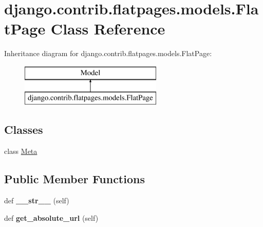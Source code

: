 \hypertarget{classdjango_1_1contrib_1_1flatpages_1_1models_1_1_flat_page}{}\section{django.\+contrib.\+flatpages.\+models.\+Flat\+Page Class Reference}
\label{classdjango_1_1contrib_1_1flatpages_1_1models_1_1_flat_page}
Inheritance diagram for django.\+contrib.\+flatpages.\+models.\+Flat\+Page\+:\begin{figure}[H]
\begin{center}
\leavevmode
\includegraphics[height=2.000000cm]{classdjango_1_1contrib_1_1flatpages_1_1models_1_1_flat_page}
\end{center}
\end{figure}
\subsection*{Classes}
\begin{DoxyCompactItemize}
\item 
class \mbox{\hyperlink{classdjango_1_1contrib_1_1flatpages_1_1models_1_1_flat_page_1_1_meta}{Meta}}
\end{DoxyCompactItemize}
\subsection*{Public Member Functions}
\begin{DoxyCompactItemize}
\item 
\mbox{\label{classdjango_1_1contrib_1_1flatpages_1_1models_1_1_flat_page_a3af1b2930c8cb1edcc024b11eb337e02}} 
def {\bfseries \+\_\+\+\_\+str\+\_\+\+\_\+} (self)
\item 
\mbox{\label{classdjango_1_1contrib_1_1flatpages_1_1models_1_1_flat_page_a1557ea146dcbbdf46a5d43597d183b43}} 
def {\bfseries get\+\_\+absolute\+\_\+url} (self)
\end{DoxyCompactItemize}
